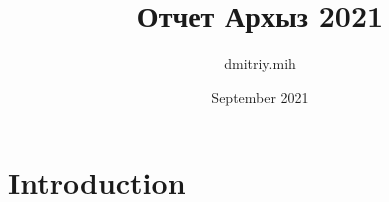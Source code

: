 \documentclass{article}
\title{Отчет Архыз 2021}
\author{dmitriy.mih }
\date{September 2021}
\begin{document}
\maketitle

\section{Introduction}
\end{document}
